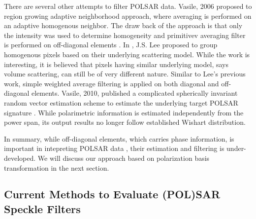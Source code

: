 There are several other attempts to filter POLSAR data.
Vasile, 2006 proposed to region growing adaptive neighborhood approach, where averaging is performed on an adaptive homogenous neighbor.
The draw back of the approach is that only the intensity was used to determine homogeneity and primitivev averaging filter is performed on off-diagonal elements \cite{Vasile_TGRS_2006}.
In \cite{Lee_2006_TGRS}, J.S. Lee proposed to group homogenous pixels based on their underlying scattering model. 
While the work is interesting, it is believed that pixels having similar underlying model, says volume scattering, can still be of very different nature.
Similar to Lee's previous work, simple weighted average filtering is applied on both diagonal and off-diagonal elements.
Vasile, 2010, published a complicated spherically invariant random vector estimation scheme to estimate the underlying target POLSAR signature \cite{Vasile_2010_TGRS}.
While polarimetric information is estimated independently from the power span, its output results no longer follow established Wishart distribution.

In summary, while off-diagonal elements, which carries phase information, is important in intepreting POLSAR data \cite{Rodionova_2009_ESASP}, their estimation and filtering is under-developed.
We will discuss our approach based on polarization basis transformation in the next section.



\subsection{Current Methods to Evaluate (POL)SAR Speckle Filters}

